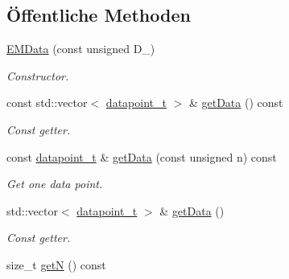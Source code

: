 \subsection*{Öffentliche Methoden}
\begin{DoxyCompactItemize}
\item 
\hyperlink{classCDA_1_1EMData_ae81ba273dcb87842699fcc1f6bd7b62a}{EMData} (const unsigned D\_)
\begin{DoxyCompactList}\small\item\em Constructor. \item\end{DoxyCompactList}\item 
\hypertarget{classCDA_1_1EMData_a0f776db698fe3871ed20a6e9af2a37ad}{
const std::vector$<$ \hyperlink{classCDA_1_1EMData_a320dfbd3ad13091a99602a140688a05d}{datapoint\_\-t} $>$ \& \hyperlink{classCDA_1_1EMData_a0f776db698fe3871ed20a6e9af2a37ad}{getData} () const }
\label{classCDA_1_1EMData_a0f776db698fe3871ed20a6e9af2a37ad}

\begin{DoxyCompactList}\small\item\em Const getter. \item\end{DoxyCompactList}\item 
const \hyperlink{classCDA_1_1EMData_a320dfbd3ad13091a99602a140688a05d}{datapoint\_\-t} \& \hyperlink{classCDA_1_1EMData_ab1acf83827d4595d2cb68c90bf7fa175}{getData} (const unsigned n) const 
\begin{DoxyCompactList}\small\item\em Get one data point. \item\end{DoxyCompactList}\item 
\hypertarget{classCDA_1_1EMData_aaab989fb0f59c828ce0c82ffaa36aace}{
std::vector$<$ \hyperlink{classCDA_1_1EMData_a320dfbd3ad13091a99602a140688a05d}{datapoint\_\-t} $>$ \& \hyperlink{classCDA_1_1EMData_aaab989fb0f59c828ce0c82ffaa36aace}{getData} ()}
\label{classCDA_1_1EMData_aaab989fb0f59c828ce0c82ffaa36aace}

\begin{DoxyCompactList}\small\item\em Const getter. \item\end{DoxyCompactList}\item 
\hypertarget{classCDA_1_1EMData_ac0839f5918bd704f111fc96183422c17}{
size\_\-t \hyperlink{classCDA_1_1EMData_ac0839f5918bd704f111fc96183422c17}{getN} () const }
\label{classCDA_1_1EMData_ac0839f5918bd704f111fc96183422c17}


\end{DoxyCompactItemize}
